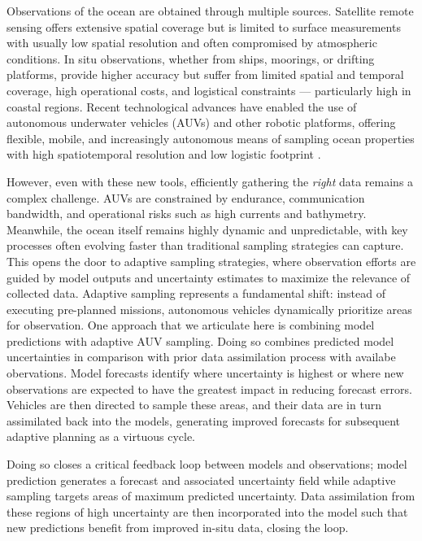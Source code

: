 Observations of the ocean are obtained through multiple sources.
Satellite remote sensing offers extensive spatial coverage but is
limited to surface measurements with usually low spatial resolution
and often compromised by atmospheric conditions. In situ observations,
whether from ships, moorings, or drifting platforms, provide higher
accuracy but suffer from limited spatial and temporal coverage, high
operational costs, and logistical constraints — particularly high in
coastal regions. Recent technological advances have enabled the use of
autonomous underwater vehicles (AUVs) and other robotic platforms,
offering flexible, mobile, and increasingly autonomous means of
sampling ocean properties with high spatiotemporal resolution and low
logistic footprint
\cite{das10,das11b,olaya12,graham12,jdas13,das15,sousa16,fossum18,fossum19,fossum19b}.

However, even with these new tools, efficiently gathering the
\textit{right} data remains a complex challenge. AUVs are constrained
by endurance, communication bandwidth, and operational risks such as
high currents and bathymetry. Meanwhile, the ocean itself remains
highly dynamic and unpredictable, with key processes often evolving
faster than traditional sampling strategies can capture. This opens
the door to adaptive sampling strategies, where observation efforts
are guided by model outputs and uncertainty estimates to maximize the
relevance of collected data. Adaptive sampling represents a
fundamental shift: instead of executing pre-planned missions,
autonomous vehicles dynamically prioritize areas for observation. One
approach that we articulate here is combining model predictions with
adaptive AUV sampling. Doing so combines predicted model uncertainties
in comparison with prior data assimilation process with availabe
obervations. Model forecasts identify where uncertainty is highest or
where new observations are expected to have the greatest impact in
reducing forecast errors. Vehicles are then directed to sample these
areas, and their data are in turn assimilated back into the models,
generating improved forecasts for subsequent adaptive planning as a
virtuous cycle.

Doing so closes a critical feedback loop between models and
observations; model prediction generates a forecast and associated
uncertainty field while adaptive sampling targets areas of maximum
predicted uncertainty. Data assimilation from these regions of high
uncertainty are then incorporated into the model such that new
predictions benefit from improved in-situ data, closing the loop.

